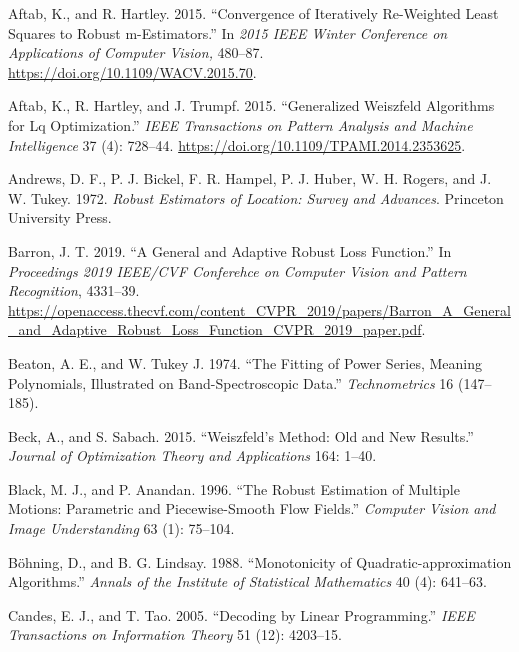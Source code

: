\documentclass[
  12pt,
  letterpaper,
  DIV=11,
  numbers=noendperiod]{scrartcl}
\newlength{\cslhangindent}
\newenvironment{CSLReferences}[2] %
 {\begin{list}{}{%
  \setlength{\itemindent}{0pt}
  \setlength{\leftmargin}{0pt}
  \setlength{\parsep}{0pt}
  \ifodd #1
   \setlength{\leftmargin}{\cslhangindent}
   \setlength{\itemindent}{-1\cslhangindent}
  \fi
  \setlength{\itemsep}{#2\baselineskip}}}
 {\end{list}}
\theoremstyle{definition}
\theoremstyle{plain}
\theoremstyle{plain}
\theoremstyle{remark}
\begin{document}
\label{refs}
\begin{CSLReferences}{1}{0}
Aftab, K., and R. Hartley. 2015. {``Convergence of Iteratively
Re-Weighted Least Squares to Robust m-Estimators.''} In \emph{2015 IEEE
Winter Conference on Applications of Computer Vision,} 480--87.
\url{https://doi.org/10.1109/WACV.2015.70}.

Aftab, K., R. Hartley, and J. Trumpf. 2015. {``Generalized Weiszfeld
Algorithms for Lq Optimization.''} \emph{IEEE Transactions on Pattern
Analysis and Machine Intelligence} 37 (4): 728--44.
\url{https://doi.org/10.1109/TPAMI.2014.2353625}.

Andrews, D. F., P. J. Bickel, F. R. Hampel, P. J. Huber, W. H. Rogers,
and J. W. Tukey. 1972. \emph{Robust Estimators of Location: Survey and
Advances}. Princeton University Press.

Barron, J. T. 2019. {``A General and Adaptive Robust Loss Function.''}
In \emph{Proceedings 2019 IEEE/CVF Conferehce on Computer Vision and
Pattern Recognition}, 4331--39.
\url{https://openaccess.thecvf.com/content_CVPR_2019/papers/Barron_A_General_and_Adaptive_Robust_Loss_Function_CVPR_2019_paper.pdf}.

Beaton, A. E., and W. Tukey J. 1974. {``The Fitting of Power Series,
Meaning Polynomials, Illustrated on Band-Spectroscopic Data.''}
\emph{Technometrics} 16 (147--185).

Beck, A., and S. Sabach. 2015. {``Weiszfeld's Method: Old and New
Results.''} \emph{Journal of Optimization Theory and Applications} 164:
1--40.

Black, M. J., and P. Anandan. 1996. {``The Robust Estimation of Multiple
Motions: Parametric and Piecewise-Smooth Flow Fields.''} \emph{Computer
Vision and Image Understanding} 63 (1): 75--104.

Böhning, D., and B. G. Lindsay. 1988. {``{Monotonicity of
Quadratic-approximation Algorithms}.''} \emph{Annals of the Institute of
Statistical Mathematics} 40 (4): 641--63.

Candes, E. J., and T. Tao. 2005. {``Decoding by Linear Programming.''}
\emph{IEEE Transactions on Information Theory} 51 (12): 4203--15.


\end{CSLReferences}
\end{document}
